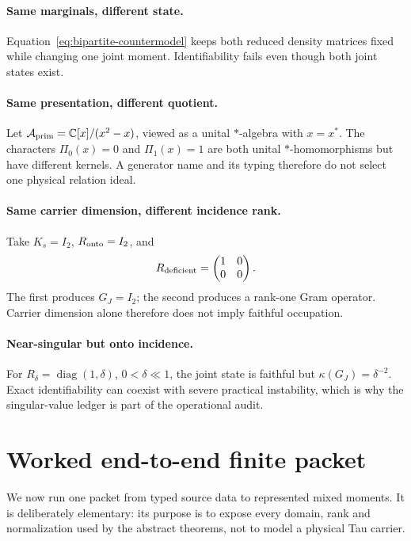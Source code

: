 \documentclass[11pt]{article}
\newcommand{\Aprim}{\mathcal A_{\rm prim}}
\begin{document}
\paragraph{Same marginals, different state.}
Equation~\eqref{eq:bipartite-countermodel} keeps both reduced density matrices
fixed while changing one joint moment.  Identifiability fails even though both
joint states exist.

\paragraph{Same presentation, different quotient.}
Let \(\Aprim=\mathbb C[x]/(x^2-x)\), viewed as a unital \(*\)-algebra with
\(x=x^*\).  The characters \(\Pi_0(x)=0\) and \(\Pi_1(x)=1\) are both unital
\(*\)-homomorphisms but have different kernels.  A generator name and its
typing therefore do not select one physical relation ideal.

\paragraph{Same carrier dimension, different incidence rank.}
Take \(K_s=I_2\), \(R_{\rm onto}=I_2\), and
\begin{equation}
 R_{\rm deficient}=\begin{pmatrix}1&0\\0&0\end{pmatrix}.
\end{equation}
The first produces \(G_J=I_2\); the second produces a rank-one Gram operator.
Carrier dimension alone therefore does not imply faithful occupation.

\paragraph{Near-singular but onto incidence.}
For \(R_\delta=\operatorname{diag}(1,\delta)\), \(0<\delta\ll1\), the joint
state is faithful but \(\kappa(G_J)=\delta^{-2}\).  Exact identifiability can
coexist with severe practical instability, which is why the singular-value
ledger is part of the operational audit.

\section{Worked end-to-end finite packet}

We now run one packet from typed source data to represented mixed moments.  It
is deliberately elementary: its purpose is to expose every domain, rank and
normalization used by the abstract theorems, not to model a physical Tau
carrier.
\end{document}
